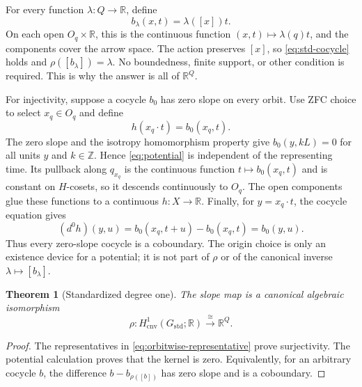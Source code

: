 \documentclass[11pt]{article}
\newtheorem{theorem}{Theorem}[section]
\theoremstyle{definition}
\newcommand{\R}{\mathbb R}
\newcommand{\Z}{\mathbb Z}
\newcommand{\Gstd}{G_{\mathrm{std}}}
\newcommand{\Hcnv}{H_{\mathrm{cnv}}}
\begin{document}
For every function $\lambda:Q\to\R$, define
\begin{equation}
\label{eq:orbitwise-representative}
 b_\lambda(x,t)=\lambda([x])t.
\end{equation}
On each open $O_q\times\R$, this is the continuous function
$(x,t)\mapsto\lambda(q)t$, and the components cover the arrow space.  The
action preserves $[x]$, so \cref{eq:std-cocycle} holds and
$\rho([b_\lambda])=\lambda$.  No boundedness, finite support, or other
condition is required.  This is why the answer is all of $\R^Q$.

For injectivity, suppose a cocycle $b_0$ has zero slope on every orbit.  Use
ZFC choice to select $x_q\in O_q$ and define
\begin{equation}
\label{eq:potential}
 h(x_q\mathbin{\cdot}t)=b_0(x_q,t).
\end{equation}
The zero slope and the isotropy homomorphism property give
$b_0(y,kL)=0$ for all units $y$ and $k\in\Z$.  Hence
\cref{eq:potential} is independent of the representing time.  Its pullback
along $q_{x_q}$ is the continuous function $t\mapsto b_0(x_q,t)$ and is
constant on $H$-cosets, so it descends continuously to $O_q$.  The open
components glue these functions to a continuous $h:X\to\R$.  Finally, for
$y=x_q\cdot t$, the cocycle equation gives
\begin{equation}
\label{eq:potential-coboundary}
 (d^0h)(y,u)
 =b_0(x_q,t+u)-b_0(x_q,t)=b_0(y,u).
\end{equation}
Thus every zero-slope cocycle is a coboundary.  The origin choice is only an
existence device for a potential; it is not part of $\rho$ or of the
canonical inverse $\lambda\mapsto[b_\lambda]$.

\begin{theorem}[Standardized degree one]
\label{thm:standard-h1}
The slope map is a canonical algebraic isomorphism
\begin{equation}
\label{eq:standard-h1}
 \rho:\Hcnv^1(\Gstd;\R)\xrightarrow{\ \cong\ }\R^Q.
\end{equation}
\end{theorem}

\begin{proof}
The representatives in \cref{eq:orbitwise-representative} prove
surjectivity.  The potential calculation proves that the kernel is zero.
Equivalently, for an arbitrary cocycle $b$, the difference
$b-b_{\rho([b])}$ has zero slope and is a coboundary.
\end{proof}
\end{document}
